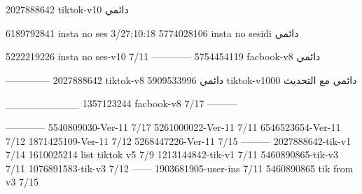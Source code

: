 2027888642 tiktok-v10
دائمي

6189792841 insta no ses
3/27;10:18
5774028106 insta no sesidi
دائمي

5222219226 insta no ses-v10
7/11
------------
5754454119 facbook-v8
دائمي


--------------
2027888642 tiktok-v8
دائمي
5909533996 tiktok-v1000
دائمي مع التحديث

__________
1357123244 facbook-v8
7/17
---------

------------
5540809030-Ver-11
7/17
5261000022-Ver-11
7/11
6546523654-Ver-11
7/12
1871425109-Ver-11
7/12
5268447226-Ver-11
7/15
---------
2027888642-tik-v1
7/14
1610025214 list tiktok v5
7/9
1213144842-tik-v1
7/11
5460890865-tik-v3
7/11
1076891583-tik-v3
7/12
------
1903681905-user-ins
7/11
5460890865 tik from v3
7/15
